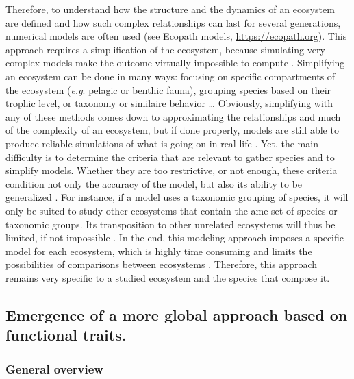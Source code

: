 Therefore, to understand how the structure and the dynamics of an ecosystem are defined and how such complex relationships can last for several generations, numerical models are often used (see Ecopath models, \url{https://ecopath.org}). This approach requires a simplification of the ecosystem, because simulating very complex models make the outcome virtually impossible to compute \citep{albouy2011}. Simplifying an ecosystem can be done in many ways: focusing on specific compartments of the ecosystem (\textit{e.g}: pelagic or benthic fauna), grouping species based on their trophic level, or taxonomy or similaire behavior \ldots{} Obviously, simplifying with any of these methods comes down to approximating the relationships and much of the complexity of an ecosystem, but if done properly, models are still able to produce reliable simulations of what is going on in real life \citep{albouy2011,evans2012,piroddi2015}. Yet, the main difficulty is to determine the criteria that are relevant to gather species and to simplify models. Whether they are too restrictive, or not enough, these criteria condition not only the accuracy of the model, but also its ability to be generalized \citep{moon2017,pease2015,pont2006}. For instance, if a model uses a taxonomic grouping of species, it will only be suited to study other ecosystems that contain the ame set of species or taxonomic groups. Its transposition to other unrelated ecosystems will thus be limited, if not impossible \citep{moon2017}. In the end, this modeling approach imposes a specific model for each ecosystem, which is highly time consuming and limits the possibilities of comparisons between ecosystems \citep{martini2020, mcgill2006}. Therefore, this approach remains very specific to a studied ecosystem and the species that compose it. 


\subsection{Emergence of a more global approach based on functional traits.}

\subsubsection{General overview}

